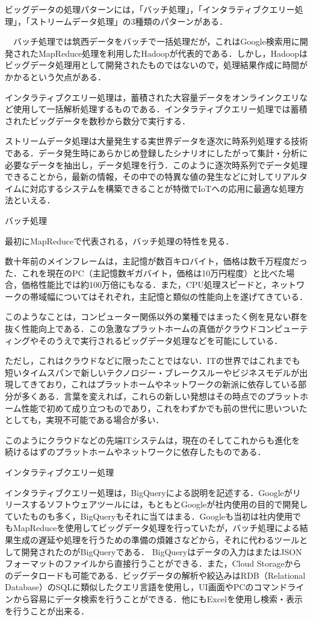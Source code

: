 ビッグデータの処理パターンには，「バッチ処理」，「インタラティブクエリー処理」，「ストリームデータ処理」の3種類のパターンがある．

　バッチ処理では筑西データをバッチで一括処理だが，これはGoogle検索用に開発されたMapReduce処理を利用したHadoopが代表的である．しかし，Hadoopはビッグデータ処理用として開発されたものではないので，処理結果作成に時間がかかるという欠点がある．

インタラティブクエリー処理は，蓄積された大容量データをオンラインクエリなど使用して一括解析処理するものである．インタラティブクエリー処理では蓄積されたビッグデータを数秒から数分で実行する．

ストリームデータ処理は大量発生する実世界データを逐次に時系列処理する技術である．データ発生時にあらかじめ登録したシナリオにしたがって集計・分析に必要なデータを抽出し，データ処理を行う．このように逐次時系列でデータ処理できることから，最新の情報，その中での特異な値の発生などに対してリアルタイムに対応するシステムを構築できることが特徴でIoTへの応用に最適な処理方法といえる．\cite{bigquerystart}


バッチ処理

最初にMapReduceで代表される，バッチ処理の特性を見る．

数十年前のメインフレームは，主記憶が数百キロバイト，価格は数千万程度だった．これを現在のPC（主記憶数ギガバイト，価格は10万円程度）と比べた場合，価格性能比では約100万倍にもなる．また，CPU処理スピードと，ネットワークの帯域幅についてはそれぞれ，主記憶と類似の性能向上を遂げてきている．

このようなことは，コンピューター関係以外の業種ではまったく例を見ない群を抜く性能向上である．この急激なプラットホームの真価がクラウドコンピューティングやそのうえで実行されるビッグデータ処理などを可能にしている．\cite{bigquerystart}

ただし，これはクラウドなどに限ったことではない．ITの世界ではこれまでも短いタイムスパンで新しいテクノロジー・ブレークスルーやビジネスモデルが出現してきており，これはプラットホームやネットワークの新派に依存している部分が多くある．言葉を変えれば，これらの新しい発想はその時点でのプラットホーム性能で初めて成り立つものであり，これをわずかでも前の世代に思いついたとしても，実現不可能である場合が多い．

このようにクラウドなどの先端ITシステムは，現在のそしてこれからも進化を続けるはずのプラットホームやネットワークに依存したものである．\cite{bigquerystart}


インタラティブクエリー処理

インタラティブクエリー処理は，BigQueryによる説明を記述する．Googleがリリースするソフトウェアツールには，もともとGoogleが社内使用の目的で開発していたものも多く，BigQueryもそれに当てはまる．Googleも当初は社内使用でもMapReduceを使用してビッグデータ処理を行っていたが，バッチ処理による結果生成の遅延や処理を行うための準備の煩雑さなどから，それに代わるツールとして開発されたのがBigQueryである．
BigQueryはデータの入力はまたはJSONフォーマットのファイルから直接行うことができる．また，Cloud Storageからのデータロードも可能である．ビッグデータの解析や絞込みはRDB（Relational Database）のSQLに類似したクエリ言語を使用し，UI画面やPCのコマンドラインから容易にデータ検索を行うことができる．他にもExcelを使用し検索・表示を行うことが出来る．\cite{bigquerystart}


